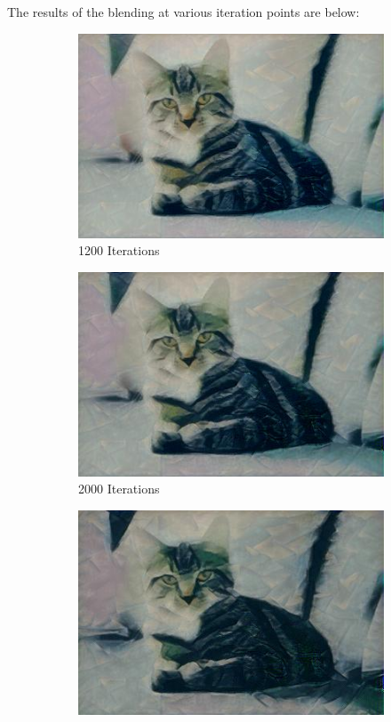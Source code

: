 \documentclass{article}
\begin{document}
The results of the blending at various iteration points are below:

\begin{figure}[H]
\begin{subfigure}{.5\textwidth}
  \centering
  \includegraphics[width=.8\linewidth]{cat_dark_1200}
  \caption{1200 Iterations}
  \label{fig:sfig1}
\end{subfigure}
\begin{subfigure}{.5\textwidth}
  \centering
  \includegraphics[width=.8\linewidth]{cat_dark_2000}
  \caption{2000 Iterations}
  \label{fig:sfig2}
\end{subfigure}
\begin{subfigure}{.5\textwidth}
  \centering
  \includegraphics[width=.8\linewidth]{cat_dark_3200}

\end{subfigure}
\end{figure}
\end{document}
